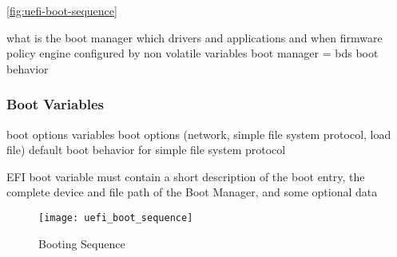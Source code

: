 \autoref{fig:uefi-boot-sequence}

what is the boot manager
which drivers and applications and when
firmware policy engine
configured by non volatile variables
\cite[3.1.]{uefi-spec}
boot manager = bds
boot behavior
\subsubsection{Boot Variables}
boot options variables
boot options (network, simple file system protocol, load file)
default boot behavior for simple file system protocol

EFI boot variable must contain a short description of the boot entry, the complete
device and file path of the Boot Manager, and some optional data
\cite{windows-internals-7-part2}

\begin{figure}[htb]%
    \centering%
    \texttt{[image: uefi\_boot\_sequence]}%
    \caption{Booting Sequence \cite[Figure 2-1]{uefi-spec}}%
    \label{fig:uefi-boot-sequence}%
\end{figure}